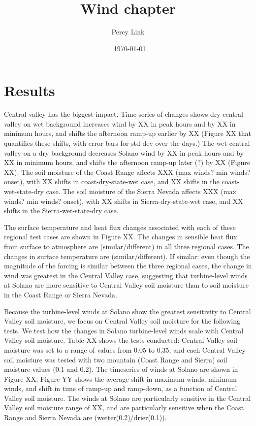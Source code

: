 \documentclass[12pt]{amsart}
\title{Wind chapter}
\author{Percy Link}
\date{\currenttime \ \today} %
\begin{document}
\maketitle

\section{Results}

Central valley has the biggest impact.  Time series of changes shows dry central valley on wet background increases wind by XX in peak hours and by XX in minimum hours, and shifts the afternoon ramp-up earlier by XX (Figure XX that quantifies these shifts, with error bars for std dev over the days.)  The wet central valley on a dry background decreases Solano wind by XX in peak hours and by XX in minimum hours, and shifts the afternoon ramp-up later (?) by XX (Figure XX).  The soil moisture of the Coast Range affects XXX (max winds? min winds? onset), with XX shifts in coast-dry-state-wet case, and XX shifts in the coast-wet-state-dry case.  The soil moisture of the Sierra Nevada affects XXX (max winds? min winds? onset), with XX shifts in Sierra-dry-state-wet case, and XX shifts in the Sierra-wet-state-dry case.

The surface temperature and heat flux changes associated with each of these regional test cases are shown in Figure XX.  The changes in sensible heat flux from surface to atmosphere are (similar/different) in all three regional cases.  The changes in surface temperature are (similar/different).  If similar: even though the magnitude of the forcing is similar between the three regional cases, the change in wind was greatest in the Central Valley case, suggesting that turbine-level winds at  Solano are more sensitive to Central Valley soil moisture than to soil moisture in the Coast Range or Sierra Nevada.

Because the turbine-level winds at Solano show the greatest sensitivity to Central Valley soil moisture, we focus on Central Valley soil moisture for the following tests.  We test how the changes in Solano turbine-level winds scale with Central Valley soil moisture.  Table XX shows the tests conducted: Central Valley soil moisture was set to a range of values from 0.05 to 0.35, and each Central Valley soil moisture was tested with two mountain (Coast Range and Sierra) soil moisture values (0.1 and 0.2).  The timeseries of winds at Solano are shown in Figure XX; Figure YY shows the average shift in maximum winds, minimum winds, and shift in time of ramp-up and ramp-down, as a function of Central Valley soil moisture.  The winds at Solano are particularly sensitive in the Central Valley soil moisture range of XX, and are particularly sensitive when the Coast Range and Sierra Nevada are (wetter(0.2)/drier(0.1)).
\end{document}
